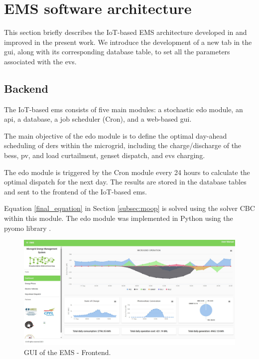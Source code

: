 \documentclass[preprint, 12pt, 3p]{elsarticle}
\begin{document}
\section{EMS software architecture}\label{sec:architecture}

This section briefly describes the IoT-based EMS architecture developed in \cite{silva2023} and improved in the present work. We introduce the development of a new tab in the \gls{gui}, 
along with its corresponding database table, to set all the parameters 
associated with the \glspl{ev}.

\subsection{Backend}

The IoT-based \gls{ems} consists of 
five main modules: a stochastic \gls{edo} module, 
an \gls{api}, a database, a job scheduler (Cron), and a web-based \gls{gui}.


The main objective of the \gls{edo} module is to 
define the optimal day-ahead scheduling of \glspl{der} within the microgrid, 
including the charge/discharge of the \gls{bess}, \gls{pv},
and load curtailment, \gls{genset} dispatch, and \glspl{ev} charging.

The \gls{edo} module is triggered by the Cron module every 24 hours to
calculate the optimal dispatch for the next day. The results are stored in the
database tables and sent to the frontend of the IoT-based \gls{ems}.

Equation \eqref{final_equation} in Section \ref{subsec:moop} is solved 
using the solver CBC \cite{cbc} within this module. The \gls{edo} module was
implemented in Python using the \gls{pyomo} library \cite{bookpyomo, artpyomo}.

\begin{figure}
    \centering
    \includegraphics[width=\textwidth]{Figures/EMS/dashboard.jpg}
    \caption{GUI of the EMS - Frontend.}
    \label{fig:EMS_Frontend}
\end{figure}
\end{document}
